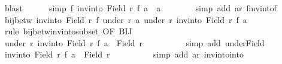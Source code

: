 \begin{isabellebody}
\ blast\isanewline
\ \ \ \ \isamarkupfalse%
\ {\isacharbrackleft}{\kern0pt}simp{\isacharbrackright}{\kern0pt}{\isacharcolon}{\kern0pt}\ {\isachardoublequoteopen}f\ {\isacharparenleft}{\kern0pt}inv{\isacharunderscore}{\kern0pt}into\ {\isacharparenleft}{\kern0pt}Field\ r{\isacharparenright}{\kern0pt}\ f\ a{\isacharparenright}{\kern0pt}\ {\isacharequal}{\kern0pt}\ a{\isachardoublequoteclose}\isanewline
\ \ \ \ \ \ \isamarkupfalse%
\ {\isacharparenleft}{\kern0pt}simp\ add{\isacharcolon}{\kern0pt}\ ar\ f{\isacharunderscore}{\kern0pt}inv{\isacharunderscore}{\kern0pt}into{\isacharunderscore}{\kern0pt}f{\isacharparenright}{\kern0pt}\isanewline
\ \ \ \ \isamarkupfalse%
\ {\isachardoublequoteopen}bij{\isacharunderscore}{\kern0pt}betw\ {\isacharparenleft}{\kern0pt}inv{\isacharunderscore}{\kern0pt}into\ {\isacharparenleft}{\kern0pt}Field\ r{\isacharparenright}{\kern0pt}\ f{\isacharparenright}{\kern0pt}\ {\isacharparenleft}{\kern0pt}under\ r{\isacharprime}{\kern0pt}\ a{\isacharparenright}{\kern0pt}\ {\isacharparenleft}{\kern0pt}under\ r\ {\isacharparenleft}{\kern0pt}inv{\isacharunderscore}{\kern0pt}into\ {\isacharparenleft}{\kern0pt}Field\ r{\isacharparenright}{\kern0pt}\ f\ a{\isacharparenright}{\kern0pt}{\isacharparenright}{\kern0pt}{\isachardoublequoteclose}\isanewline
\ \ \ \ \isamarkupfalse%
\ {\isacharparenleft}{\kern0pt}rule\ bij{\isacharunderscore}{\kern0pt}betw{\isacharunderscore}{\kern0pt}inv{\isacharunderscore}{\kern0pt}into{\isacharunderscore}{\kern0pt}subset\ {\isacharbrackleft}{\kern0pt}OF\ BIJ{\isacharbrackright}{\kern0pt}{\isacharparenright}{\kern0pt}\isanewline
\ \ \ \ \ \ \isamarkupfalse%
\ {\isachardoublequoteopen}under\ r\ {\isacharparenleft}{\kern0pt}inv{\isacharunderscore}{\kern0pt}into\ {\isacharparenleft}{\kern0pt}Field\ r{\isacharparenright}{\kern0pt}\ f\ a{\isacharparenright}{\kern0pt}\ {\isasymsubseteq}\ Field\ r{\isachardoublequoteclose}\isanewline
\ \ \ \ \ \ \ \ \isamarkupfalse%
\ {\isacharparenleft}{\kern0pt}simp\ add{\isacharcolon}{\kern0pt}\ under{\isacharunderscore}{\kern0pt}Field{\isacharparenright}{\kern0pt}\isanewline
\ \ \ \ \ \ \isamarkupfalse%
\ {\isachardoublequoteopen}inv{\isacharunderscore}{\kern0pt}into\ {\isacharparenleft}{\kern0pt}Field\ r{\isacharparenright}{\kern0pt}\ f\ a\ {\isasymin}\ Field\ r{\isachardoublequoteclose}\isanewline
\ \ \ \ \ \ \ \ \isamarkupfalse%
\ {\isacharparenleft}{\kern0pt}simp\ add{\isacharcolon}{\kern0pt}\ ar\ inv{\isacharunderscore}{\kern0pt}into{\isacharunderscore}{\kern0pt}into{\isacharparenright}{\kern0pt}\isanewline

\end{isabellebody}
